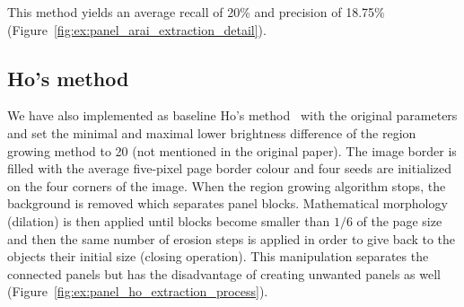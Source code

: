This method yields an average recall of 20\% and precision of 18.75\% (Figure~\ref{fig:ex:panel_arai_extraction_detail}).




\subsection{Ho's method} %
We have also implemented as baseline Ho's method~\cite{Ho2012} with the original parameters and set the minimal and maximal lower brightness difference of the region growing method to 20 (not mentioned in the original paper).
The image border is filled with the average five-pixel page border colour and four seeds are initialized on the four corners of the image.
When the region growing algorithm stops, the background is removed which separates panel blocks.
Mathematical morphology (dilation) is then applied until blocks become smaller than $1/6$ of the page size and then the same number of erosion steps is applied in order to give back to the objects their initial size (closing operation).
This manipulation separates the connected panels but has the disadvantage of creating unwanted panels as well (Figure~\ref{fig:ex:panel_ho_extraction_process}).

